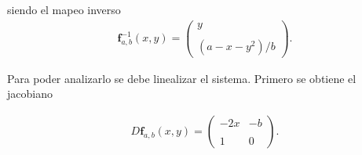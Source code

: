 siendo el mapeo inverso
\begin{eqnarray}
\mathbf{f}^{-1}_{a,b}(x,y)=\left( \begin{array}{lcc}
             y\\
             \\ (a-x-y^{2})/b
             \end{array}
             \right). \label{HenonI}
\end{eqnarray} 

       
Para poder analizarlo se debe linealizar el sistema. Primero se obtiene el jacobiano 
            
\begin{eqnarray}
D\mathbf{f}_{a,b}(x,y)= \left( \begin{array}{lcc}
                -2x & -b\\
                \\ 1 & 0
                \end{array}
                \right).
                \label{jacobiano-henon}
\end{eqnarray}

